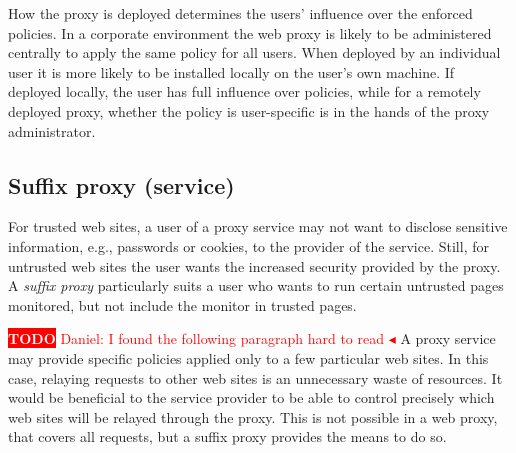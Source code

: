 \documentclass{llncs}
\newcommand{\todo}[1]{\colorbox{red}{\textcolor{white}{\sffamily\bfseries\scriptsize TODO}} \textcolor{red}{#1} \textcolor{red}{$\blacktriangleleft$}}
\begin{document}
How the proxy is 
deployed determines the users' influence over 
the enforced policies.
In a corporate environment the web proxy is likely to be 
administered centrally to apply the same policy for all users. When deployed by 
an individual user it is more likely to be installed locally on the user's own machine.
If deployed locally, the user has full influence over 
policies, while for a remotely deployed proxy,
whether the policy is user-specific is 
in the hands of the proxy administrator. 






\subsection{Suffix proxy (service)}
\label{sec:arch-suffix}


For trusted web sites, a user of a proxy service may not want to disclose
sensitive information, e.g., passwords or cookies, to the provider of the service.
Still, for untrusted web sites the user wants the increased security provided 
by the proxy.
A \emph{suffix proxy} particularly suits a user who wants to run certain untrusted 
pages monitored, but not include the monitor in trusted pages.

\todo{Daniel: I found the following paragraph hard to read}
A proxy service may provide specific policies applied only to a few 
particular web sites. In this case, relaying requests to other web sites is an 
unnecessary waste of resources. It would be beneficial to the service provider to be
able to control precisely which web sites will be relayed through the proxy. 
This is not possible in a web proxy, that covers all requests, but a suffix proxy 
provides the means to do so.
\end{document}
